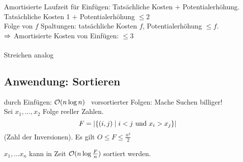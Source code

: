             Amortisierte Laufzeit für Einfügen: Tatsächliche Kosten + Potentialerhöhung. \\
            Tatsächliche Kosten 1 + Potentialerhöhung $\leq 2$ \\
            Folge von $f$ Spaltungen: tatsächliche Kosten $f$, Potentialerhöhung $\leq f$. \\
            $\Ra$ Amortisierte Kosten von Einfügen: $\leq 3$ \\\\
            Streichen analog\\

        \subsection{Anwendung: Sortieren} 
            durch Einfügen: $\mathcal{O}(n \log n)$ \
            vorsortierter Folgen: Mache Suchen billiger! \\
            Sei $x_1, \ldots, x_2$ Folge reeller Zahlen. \\
            $$F= \left| \{ (i,j) \mid i < j \text{ und } x_i > x_j \} \right|$$
            (Zahl der Inversionen). Es gilt $O \leq F \leq \frac{n^2}{2}$

            \begin{satz}
            $x_1, \ldots x_n$ kann in Zeit $\mathcal{O}(n \log \frac{F}{n})$ sortiert werden. 
            \end{satz}

